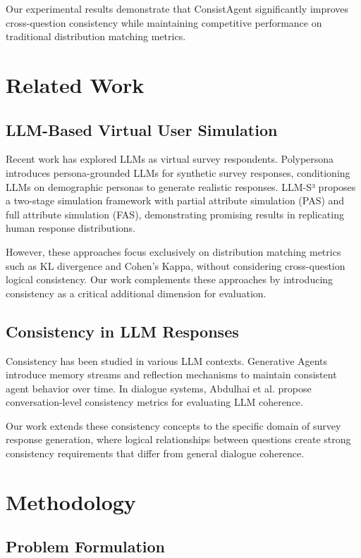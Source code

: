\documentclass[sigconf, anonymous]{acmart}
\begin{document}
Our experimental results demonstrate that ConsistAgent significantly improves cross-question consistency while maintaining competitive performance on traditional distribution matching metrics.

\section{Related Work}

\subsection{LLM-Based Virtual User Simulation}

Recent work has explored LLMs as virtual survey respondents. Polypersona introduces persona-grounded LLMs for synthetic survey responses, conditioning LLMs on demographic personas to generate realistic responses. LLM-S³ proposes a two-stage simulation framework with partial attribute simulation (PAS) and full attribute simulation (FAS), demonstrating promising results in replicating human response distributions.

However, these approaches focus exclusively on distribution matching metrics such as KL divergence and Cohen's Kappa, without considering cross-question logical consistency. Our work complements these approaches by introducing consistency as a critical additional dimension for evaluation.

\subsection{Consistency in LLM Responses}

Consistency has been studied in various LLM contexts. Generative Agents introduce memory streams and reflection mechanisms to maintain consistent agent behavior over time. In dialogue systems, Abdulhai et al. propose conversation-level consistency metrics for evaluating LLM coherence.

Our work extends these consistency concepts to the specific domain of survey response generation, where logical relationships between questions create strong consistency requirements that differ from general dialogue coherence.

\section{Methodology}

\subsection{Problem Formulation}
\end{document}
